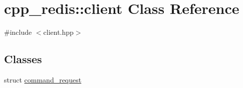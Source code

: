 \hypertarget{classcpp__redis_1_1client}{}\section{cpp\+\_\+redis\+:\+:client Class Reference}
\label{classcpp__redis_1_1client}


{\ttfamily \#include $<$client.\+hpp$>$}

\subsection*{Classes}
\begin{DoxyCompactItemize}
\item 
struct \hyperlink{structcpp__redis_1_1client_1_1command__request}{command\+\_\+request}
\end{DoxyCompactItemize}
